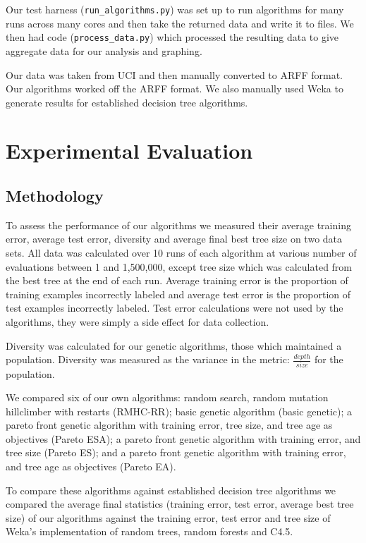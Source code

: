\documentclass{acm_proc_article-sp}
\begin{document}
Our test harness (\texttt{run\_algorithms.py}) was set up to run algorithms for many runs across many cores and then take the returned data and write it to files. We then had code (\texttt{process\_data.py}) which processed the resulting data to give aggregate data for our analysis and graphing.

Our data was taken from UCI \cite{Bache+Lichman:2013} and then manually converted to ARFF format. Our algorithms worked off the ARFF format. We also manually used Weka \cite{Hall:2009} to generate results for established decision tree algorithms.

\section{Experimental Evaluation}

\subsection{Methodology}

To assess the performance of our algorithms we measured their average training error, average test error, diversity and average final best tree size on two data sets. All data was calculated over 10 runs of each algorithm at various number of evaluations between 1 and 1,500,000, except tree size which was calculated from the best tree at the end of each run. Average training error is the proportion of training examples incorrectly labeled and average test error is the proportion of test examples incorrectly labeled. Test error calculations were not used by the algorithms, they were simply a side effect for data collection.

Diversity was calculated for our genetic algorithms, those which maintained a population. Diversity was measured as the variance in the metric: $\frac{depth}{size}$ for the population.

We compared six of our own algorithms: random search, random mutation hillclimber with restarts (RMHC-RR); basic genetic algorithm (basic genetic); a pareto front genetic algorithm with training error, tree size, and tree age as objectives (Pareto ESA); a pareto front genetic algorithm with training error, and tree size (Pareto ES); and a pareto front genetic algorithm with training error, and tree age as objectives (Pareto EA).

To compare these algorithms against established decision tree algorithms we compared the average final statistics (training error, test error, average best tree size) of our algorithms against the training error, test error and tree size of Weka's \cite{Hall:2009} implementation of random trees, random forests and C4.5.
\end{document}
